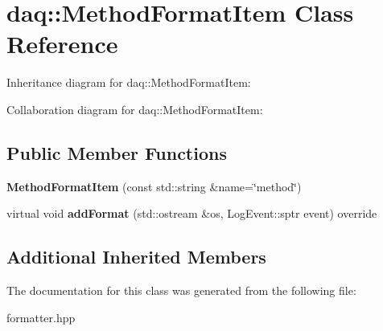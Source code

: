 \hypertarget{classdaq_1_1MethodFormatItem}{}\section{daq\+:\+:Method\+Format\+Item Class Reference}
\label{classdaq_1_1MethodFormatItem}


Inheritance diagram for daq\+:\+:Method\+Format\+Item\+:


Collaboration diagram for daq\+:\+:Method\+Format\+Item\+:
\subsection*{Public Member Functions}
\begin{DoxyCompactItemize}
\item 
\mbox{\label{classdaq_1_1MethodFormatItem_a3ad6ae850076f4a9e60dd740785f840f}} 
{\bfseries Method\+Format\+Item} (const std\+::string \&name=\char`\"{}method\char`\"{})
\item 
\mbox{\label{classdaq_1_1MethodFormatItem_aba75d243fc5f667e7347279eb0716efe}} 
virtual void {\bfseries add\+Format} (std\+::ostream \&os, Log\+Event\+::sptr event) override
\end{DoxyCompactItemize}
\subsection*{Additional Inherited Members}


The documentation for this class was generated from the following file\+:\begin{DoxyCompactItemize}
\item 
formatter.\+hpp\end{DoxyCompactItemize}
